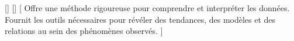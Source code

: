 \def\theme{Statistique à une ou deux variables, représentation et analyse de données}
\def\date{**/**/2023}

\hbox{}
[]
[]
[   
    Offre une méthode rigoureuse pour comprendre et interpréter les
    données.
    Fournit les outils nécessaires pour révéler des tendances, 
    des modèles et des relations au sein des phénomènes observés.
]